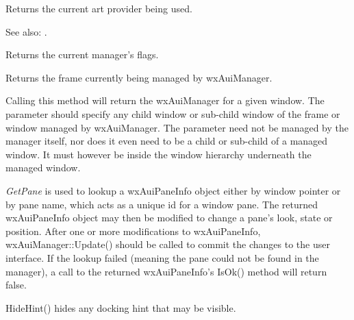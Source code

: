 
Returns the current art provider being used.

See also: .

\label{wxauimanagergetflags}


Returns the current manager's flags.

\label{wxauimanagergetmanagedwindow}


Returns the frame currently being managed by wxAuiManager.


Calling this method will return the wxAuiManager for a given window.  The  parameter should
specify any child window or sub-child window of the frame or window managed by wxAuiManager.
The  parameter need not be managed by the manager itself, nor does it even need to be a child
or sub-child of a managed window.  It must however be inside the window hierarchy underneath the managed
window.

\label{wxauimanagergetpane}



{\it GetPane} is used to lookup a wxAuiPaneInfo object
either by window pointer or by pane name, which acts as a unique id for
a window pane. The returned wxAuiPaneInfo object may then be modified to
change a pane's look, state or position. After one or more
modifications to wxAuiPaneInfo, wxAuiManager::Update() should be called
to commit the changes to the user interface. If the lookup failed
(meaning the pane could not be found in the manager), a call to the
returned wxAuiPaneInfo's IsOk() method will return false.

\label{wxauimanagerhidehint}


HideHint() hides any docking hint that may be visible.

\label{wxauimanagerinsertpane}

